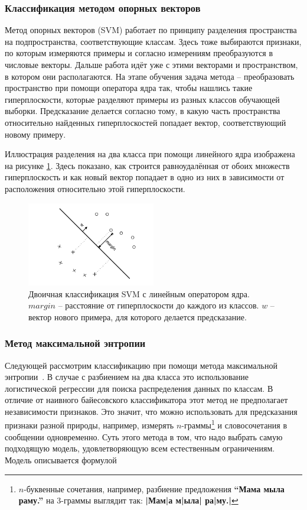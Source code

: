 \subsubsection{Классификация методом опорных векторов}
Метод опорных векторов (SVM) \cite{tong2002support} работает по принципу разделения пространства на
подпространства, соответствующие классам. Здесь тоже выбираются признаки, по которым измеряются
примеры и согласно измерениям преобразуются в числовые векторы. Дальше работа идёт уже с этими векторами и
пространством, в котором они располагаются. На этапе обучения задача метода -- преобразовать
пространство при помощи оператора ядра так, чтобы нашлись такие гиперплоскости,
которые разделяют примеры из разных классов обучающей выборки. Предсказание делается
согласно тому, в какую часть пространства относительно найденных гиперплоскостей попадает вектор,
соответствующий новому примеру.

Иллюстрация разделения на два класса при помощи линейного ядра изображена на рисунке
\ref{linear_svm}. Здесь показано, как строится равноудалённая от обоих множеств гиперплоскость и как
новый вектор попадает в одно из них в зависимости от расположения относительно этой гиперплоскости.

\begin{figure}
  \centering
  \includegraphics[width=0.5\textwidth]{linear_svm}
  \caption{Двоичная классификация SVM с линейным оператором ядра. $margin$ -- расстояние от
    гиперплоскости до каждого из классов. $w$ -- вектор нового примера, для которого делается предсказание.}\label{linear_svm}
\end{figure}

\subsubsection{Метод максимальной энтропии}
Следующей рассмотрим классификацию при помощи метода максимальной энтропии~\cite{nigam1999using}. В
случае с разбиением на два класса это использование логистической регрессии для поиска распределения
данных по классам. В отличие от наивного байесовского классификатора этот метод не
предполагает независимости признаков. Это значит, что можно использовать для предсказания признаки
разной природы, например, измерять $n$-граммы\footnote{$n$-буквенные сочетания, например, разбиение
  предложения \textbf{``Мама мыла раму.''} на 3-граммы выглядит так: \textbf{|Мам|а м|ыла| ра|му.|}} и словосочетания в сообщении одновременно.
Суть этого метода в том, что надо выбрать самую
подходящую модель, удовлетворяющую всем естественным ограничениям. Модель описывается формулой

